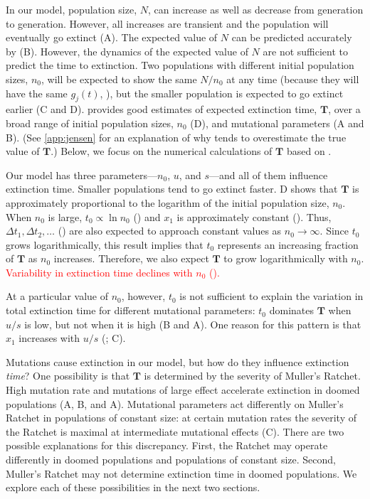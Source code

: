 \documentclass[9pt,lineno]{elife}
\newcommand{\red}{\textcolor{red}}
\begin{document}
In our model, population size, $N$, can increase as well as decrease from generation to generation.  However, all increases are transient and the population will eventually go extinct (A).  The expected value of $N$ can be predicted accurately by  (B).  However, the dynamics of the expected value of $N$ are not sufficient to predict the time to extinction.  Two populations with different initial population sizes, $n_0$, will be expected to show the same $N/n_0$ at any time (because they will have the same $g_j(t)$, ), but the smaller population is expected to go extinct earlier (C and D).   provides good estimates of expected extinction time, $\mathbf{T}$, over a broad range of initial population sizes, $n_0$ (D), and mutational parameters (A and B).  
(See \autoref{app:jensen} for an explanation of why  tends to overestimate the true value of $\mathbf{T}$.)  
Below, we focus on the numerical calculations of $\mathbf{T}$ based on .

Our model has three parameters---$n_0$, $u$, and $s$---and all of them influence extinction time.  Smaller populations tend to go extinct faster.  D shows that $\mathbf{T}$ is approximately proportional to the logarithm of the initial population size, $n_0$.  
%
When $n_0$ is large, $t_0 \propto \ln n_0$ () and $x_1$ is approximately constant ().
Thus, 
$\Delta t_1, \Delta t_2, \ldots$ ()
are also expected to approach constant values as $n_0\to\infty$.  Since
$t_0$ grows logarithmically, this result implies that $t_0$ represents an increasing fraction of $\mathbf{T}$ as $n_0$ increases. 
Therefore, we also expect $\mathbf{T}$ to grow logarithmically with $n_0$. 
\red{Variability in extinction time declines with $n_0$ ().}

At a particular value of $n_0$, however, $t_0$ is not sufficient to explain the variation in total extinction time for different mutational parameters: 
$t_0$ dominates $\mathbf{T}$ when $u/s$ is low, but not when it is high (B and A).  One reason for this pattern is that $x_1$ increases with $u/s$ (; C).

Mutations cause extinction in our model, but how do they influence extinction \textit{time}?  
%
One possibility is that $\mathbf{T}$ is determined by the severity of Muller's Ratchet. High mutation rate and mutations of large effect accelerate extinction in doomed populations (A, B, and A).  Mutational parameters act differently on Muller's Ratchet in populations of constant size: at certain mutation rates the severity of the Ratchet is maximal at intermediate mutational effects \citep{Gabriel_MULLER_1993, Gordo_On_2000, gor00b} (C).
%
There are two possible explanations for this discrepancy.  
%
First, the Ratchet may operate differently in doomed populations and populations of constant size. 
%
Second, Muller's Ratchet may not determine extinction time in doomed populations.  
%
We explore each of these possibilities in the next two sections.  
\end{document}
